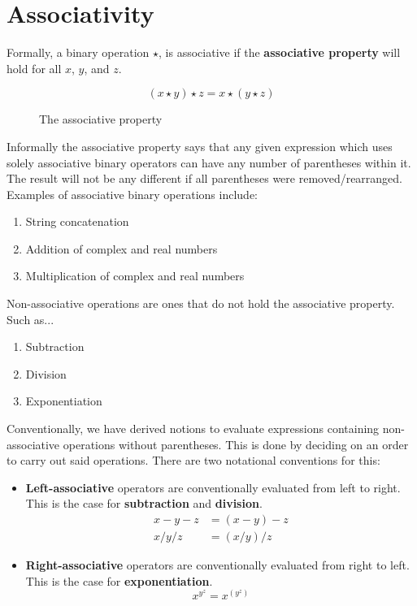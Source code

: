 \section{Associativity}

Formally, a binary operation $\star$, is associative if the \textbf{associative property} will hold for all $x$, $y$, and $z$.

\begin{figure}[H]
    \begin{equation}
        (x \star y) \star z = x \star (y \star z)
        \nonumber
    \end{equation}
    \caption{\label{fig:4.1}The associative property}
\end{figure}

Informally the associative property says that any given expression which uses solely associative binary operators can have any number of parentheses within it. The result will not be any different if all parentheses were removed/rearranged. Examples of associative binary operations include:

\begin{enumerate}
    \item String concatenation
    \item Addition of complex and real numbers
    \item Multiplication of complex and real numbers
\end{enumerate}

Non-associative operations are ones that do not hold the associative property. Such as...

\begin{enumerate}
    \item Subtraction
    \item Division
    \item Exponentiation
\end{enumerate}

Conventionally, we have derived notions to evaluate expressions containing non-associative operations without parentheses. This is done by deciding on an order to carry out said operations. There are two notational conventions for this:

\begin{itemize}
    \item \textbf{Left-associative} operators are conventionally evaluated from left to right. This is the case for \textbf{subtraction} and \textbf{division}.
    \begin{equation}
        \begin{split}
            x - y - z &= (x - y) - z\\
            x / y / z &= (x / y) / z
        \end{split}
        \nonumber
    \end{equation}
    \item \textbf{Right-associative} operators are conventionally evaluated from right to left. This is the case for \textbf{exponentiation}.
    \begin{equation}
        x^{y^z} = x^{(y^z)}
        \nonumber
    \end{equation}
\end{itemize}

